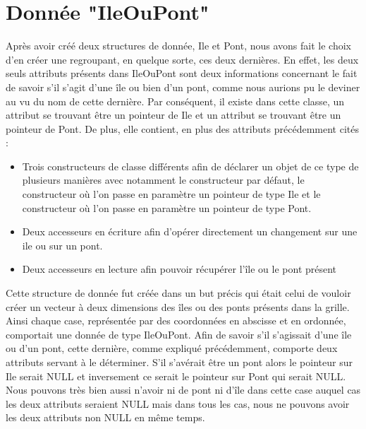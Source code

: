 \section{Donnée "IleOuPont"}
Après avoir créé deux structures de donnée, Ile et Pont, nous avons fait le choix d'en créer une regroupant, en quelque sorte, ces deux dernières. En effet, les deux seuls attributs présents dans IleOuPont sont deux informations concernant le fait de savoir s'il s'agit d'une île ou bien d'un pont, comme nous aurions pu le deviner au vu du nom de cette dernière. Par conséquent, il existe dans cette classe, un attribut se trouvant être un pointeur de Ile et un attribut se trouvant être un pointeur de Pont. De plus, elle contient, en plus des attributs précédemment cités :
\begin{itemize}
    \item Trois constructeurs de classe différents afin de déclarer un objet de ce type de plusieurs manières avec notamment le constructeur par défaut, le constructeur où l'on passe en paramètre un pointeur de type Ile et le constructeur où l'on passe en paramètre un pointeur de type Pont.
    \item Deux accesseurs en écriture afin d'opérer directement un changement sur une ile ou sur un pont.
    \item Deux accesseurs en lecture afin pouvoir récupérer l'île ou le pont présent 
\end{itemize}
\smallbreak
Cette structure de donnée fut créée dans un but précis qui était celui de vouloir créer un vecteur à deux dimensions des îles ou des ponts présents dans la grille. Ainsi chaque case, représentée par des coordonnées en abscisse et en ordonnée, comportait une donnée de type IleOuPont. Afin de savoir s'il s'agissait d'une île ou d'un pont, cette dernière, comme expliqué précédemment, comporte deux attributs servant à le déterminer. S'il s'avérait être un pont alors le pointeur sur Ile serait NULL et inversement ce serait le pointeur sur Pont qui serait NULL. Nous pouvons très bien aussi n'avoir ni de pont ni d'île dans cette case auquel cas les deux attributs seraient NULL mais dans tous les cas, nous ne pouvons avoir les deux attributs non NULL en même temps.

